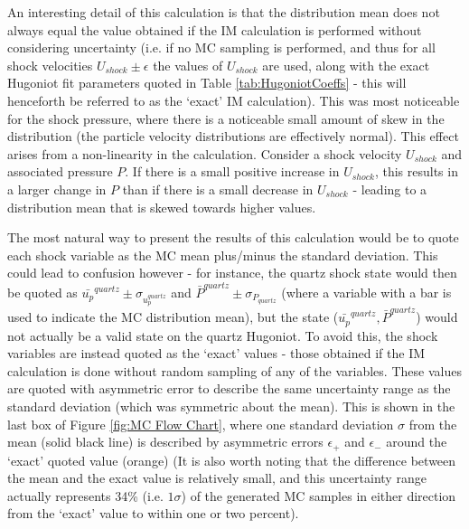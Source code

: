 An interesting detail of this calculation is that the distribution mean does not always equal the value obtained if the IM calculation is performed without considering uncertainty (i.e. if no MC sampling is performed, and thus for all shock velocities $U_{shock} \pm \epsilon$ the values of $U_{shock}$ are used, along with the exact Hugoniot fit parameters quoted in Table \ref{tab:HugoniotCoeffs} - this will henceforth be referred to as the `exact' IM calculation). This was most noticeable for the shock pressure, where there is a noticeable small amount of skew in the distribution (the particle velocity distributions are effectively normal). This effect arises from a non-linearity in the calculation. Consider a shock velocity $U_{shock}$ and associated pressure $P$. If there is a small positive increase in $U_{shock}$, this results in a larger change in $P$ than if there is a small decrease in $U_{shock}$ - leading to a distribution mean that is skewed towards higher values.

The most natural way to present the results of this calculation would be to quote each shock variable as the MC mean plus/minus the standard deviation. This could lead to confusion however - for instance, the quartz shock state would then be quoted as $\bar{u_p}^{quartz} \pm \sigma_{u_p^{quartz}}$ and $\bar{P}^{quartz} \pm \sigma_{P_{quartz}}$ (where a variable with a bar is used to indicate the MC distribution mean), but the state ($\bar{u_p}^{quartz}, \bar{P}^{quartz}$) would not actually be a valid state on the quartz Hugoniot. To avoid this, the shock variables are instead quoted as the `exact' values - those obtained if the IM calculation is done without random sampling of any of the variables. These values are quoted with asymmetric error to describe the same uncertainty range as the standard deviation (which was symmetric about the mean). This is shown in the last box of Figure \ref{fig:MC Flow Chart}, where one standard deviation $\sigma$ from the mean (solid black line) is described by asymmetric errors $\epsilon_+$ and $\epsilon_-$ around the `exact' quoted value (orange) (It is also worth noting that the difference between the mean and the exact value is relatively small, and this uncertainty range actually represents 34\% (i.e. $1 \sigma$) of the generated MC samples in either direction from the `exact' value to within one or two percent).

